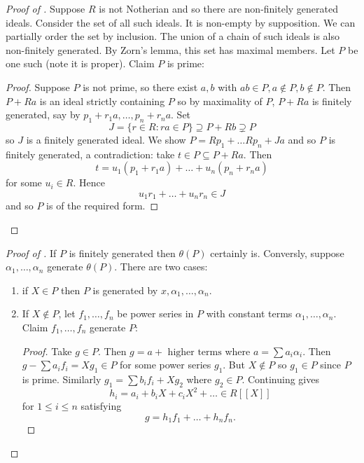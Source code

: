 \documentclass[a4paper]{article}
\begin{document}
\begin{proof}[Proof of ]
  Suppose \(R\) is not Notherian and so there are non-finitely generated ideals. Consider the set of all such ideals. It is non-empty by supposition. We can partially order the set by inclusion. The union of a chain of such ideals is also non-finitely generated. By Zorn's lemma, this set has maximal members. Let \(P\) be one such (note it is proper). Claim \(P\) is prime:

  \begin{proof}
    Suppose \(P\) is not prime, so there exist \(a, b\) with \(ab \in P, a \notin P, b \notin P\). Then \(P + Ra\) is an ideal strictly containing \(P\) so by maximality of \(P\), \(P + Ra\) is finitely generated, say by \(p_1 + r_1 a, \dots , p_n + r_n a\). Set
    \[
      J = \{r \in R: ra \in P\} \supseteq P + Rb \supsetneq P
    \]
    so \(J\) is a finitely generated ideal. We show \(P = Rp_1 + \dots Rp_n + Ja\) and so \(P\) is finitely generated, a contradiction: take \(t \in P \subseteq P + Ra\). Then
    \[
      t = u_1(p_1 + r_1a) + \dots + u_n(p_n + r_na)
    \]
    for some \(u_i \in R\). Hence
    \[
      u_1r_1 + \dots + u_nr_n \in J
    \]
    and so \(P\) is of the required form.
  \end{proof}
\end{proof}

\begin{proof}[Proof of ]
  If \(P\) is finitely generated then \(\theta(P)\) certainly is. Conversly, suppose \(\alpha_1, \dots, \alpha_n\) generate \(\theta(P)\). There are two cases:
  \begin{enumerate}
  \item if \(X \in P\) then \(P\) is generated by \(x, \alpha_1, \dots, \alpha_n\).
  \item If \(X \notin P\), let \(f_1, \dots, f_n\) be power series in \(P\) with constant terms \(\alpha_1, \dots, \alpha_n\). Claim \(f_1, \dots, f_n\) generate \(P\):

    \begin{proof}
      Take \(g \in P\). Then \(g = a + \text{ higher terms}\) where \(a = \sum a_i \alpha_i\). Then \(g - \sum a_i f_i = X g_1 \in P\) for some power series \(g_1\). But \(X \notin P\) so \(g_1 \in P\) since \(P\) is prime. Similarly \(g_1 = \sum b_if_i + X g_2\) where \(g_2 \in P\). Continuing gives
      \[
        h_i = a_i + b_i X + c_i X^2 + \dots \in R[[X]]
      \]
      for \(1 \leq i \leq n\) satisfying
      \[
        g = h_1f_1 + \dots + h_n f_n.
      \]
    \end{proof}
  \end{enumerate}
\end{proof}
\end{document}
